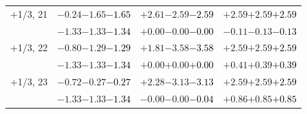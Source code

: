 \documentclass[compress]{beamer}
\begin{document}
\begin{frame}
\begin{tabular}{r | c | c | c}
$+$1/3, 21 & $-0.24$\hspace{0.1 cm}$-1.65$\hspace{0.1 cm}\textcolor{black}{$-1.65$} & $+2.61$\hspace{0.1 cm}$-2.59$\hspace{0.1 cm}\textcolor{black}{$-2.59$} & $+2.59$\hspace{0.1 cm}$+2.59$\hspace{0.1 cm}\textcolor{black}{$+2.59$} \\
           & $-1.33$\hspace{0.1 cm}$-1.33$\hspace{0.1 cm}\textcolor{black}{$-1.34$} & $+0.00$\hspace{0.1 cm}$-0.00$\hspace{0.1 cm}\textcolor{black}{$-0.00$} & $-0.11$\hspace{0.1 cm}$-0.13$\hspace{0.1 cm}\textcolor{black}{$-0.13$} \\
$+$1/3, 22 & $-0.80$\hspace{0.1 cm}$-1.29$\hspace{0.1 cm}\textcolor{black}{$-1.29$} & $+1.81$\hspace{0.1 cm}$-3.58$\hspace{0.1 cm}\textcolor{black}{$-3.58$} & $+2.59$\hspace{0.1 cm}$+2.59$\hspace{0.1 cm}\textcolor{black}{$+2.59$} \\
           & $-1.33$\hspace{0.1 cm}$-1.33$\hspace{0.1 cm}\textcolor{black}{$-1.34$} & $+0.00$\hspace{0.1 cm}$+0.00$\hspace{0.1 cm}\textcolor{black}{$+0.00$} & $+0.41$\hspace{0.1 cm}$+0.39$\hspace{0.1 cm}\textcolor{black}{$+0.39$} \\
$+$1/3, 23 & $-0.72$\hspace{0.1 cm}$-0.27$\hspace{0.1 cm}\textcolor{black}{$-0.27$} & $+2.28$\hspace{0.1 cm}$-3.13$\hspace{0.1 cm}\textcolor{black}{$-3.13$} & $+2.59$\hspace{0.1 cm}$+2.59$\hspace{0.1 cm}\textcolor{black}{$+2.59$} \\
           & $-1.33$\hspace{0.1 cm}$-1.33$\hspace{0.1 cm}\textcolor{black}{$-1.34$} & $-0.00$\hspace{0.1 cm}$-0.00$\hspace{0.1 cm}\textcolor{black}{$-0.04$} & $+0.86$\hspace{0.1 cm}$+0.85$\hspace{0.1 cm}\textcolor{black}{$+0.85$} \\

\end{tabular}
\end{frame}
\end{document}
